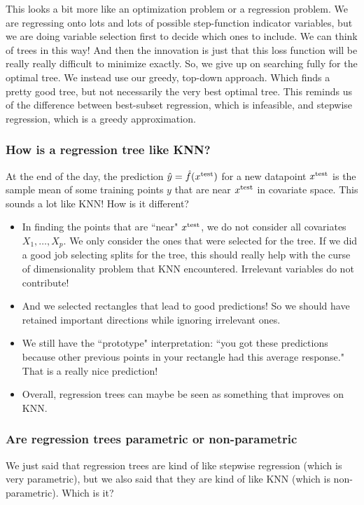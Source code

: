 This looks a bit more like an optimization problem or a regression problem. We are regressing onto lots and lots of possible step-function indicator variables, but we are doing variable selection first to decide which ones to include. We can think of trees in this way! And then the innovation is just that this loss function will be really really difficult to minimize exactly. So, we give up on searching fully for the optimal tree. We instead use our greedy, top-down approach. Which finds a pretty good tree, but not necessarily the very best optimal tree. This reminds us of the difference between best-subset regression, which is infeasible, and stepwise regression, which is a greedy approximation.


\subsubsection{How is a regression tree like KNN?}

At the end of the day, the prediction $\hat{y} = \hat{f}(x^{\mathrm{test}})$ for a new datapoint $x^{\mathrm{test}}$ is the sample mean of some training points $y$ that are near $x^{\mathrm{test}}$ in covariate space. This sounds a lot like KNN! How is it different?
\begin{itemize}
\item In finding the points that are ``near" $x^{\mathrm{test}}$, we do not consider all covariates $X_1,\ldots,X_p$. We only consider the ones that were selected for the tree. If we did a good job selecting splits for the tree, this should really help with the curse of dimensionality problem that KNN encountered. Irrelevant variables do not contribute! 
\item And we selected rectangles that lead to good predictions! So we should have retained important directions while ignoring irrelevant ones. 
\item We still have the ``prototype" interpretation: ``you got these predictions because other previous points in your rectangle 	had this average response." That is a really nice prediction! 
\item Overall, regression trees can maybe be seen as something that improves on KNN.
\end{itemize}

\subsubsection{Are regression trees parametric or non-parametric}

We just said that regression trees are kind of like stepwise regression (which is very parametric), but we also said that they are kind of like KNN (which is non-parametric). Which is it?

